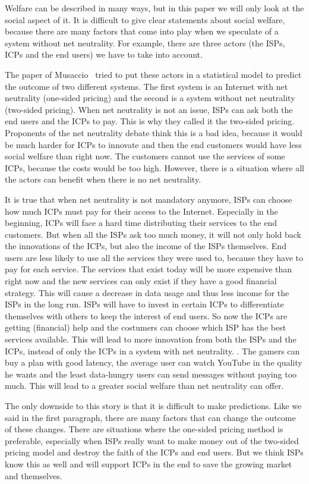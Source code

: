 Welfare can be described in many ways, but in this paper we will only look at the social aspect of it. It is difficult to give clear statements about social welfare, because there are many factors that come into play when we speculate of a system without net neutrality. For example, there are three actors (the \acp{ISP}, \acp{ICP} and the end users) we have to take into account.

The paper of Musaccio~\cite{musacchio2009} tried to put these actors in a statistical model to predict the outcome of two different systems. The first system is an Internet with net neutrality (one-sided pricing) and the second is a system without net neutrality (two-sided pricing). When net neutrality is not an issue, \acp{ISP} can ask both the end users and the \acp{ICP} to pay. This is why they called it the two-sided pricing. Proponents of the net neutrality debate think this is a bad idea, because it would be much harder for \acp{ICP} to innovate and then the end customers would have less social welfare than right now. The customers cannot use the services of some \acp{ICP}, because the costs would be too high. However, there is a situation where all the actors can benefit when there is no net neutrality.

It is true that when net neutrality is not mandatory anymore, \acp{ISP} can choose how much \acp{ICP} must pay for their access to the Internet. Especially in the beginning, \acp{ICP} will face a hard time distributing their services to the end customers. But when all the \acp{ISP} ask too much money, it will not only hold back the innovations of the \acp{ICP}, but also the income of the \acp{ISP} themselves. End users are less likely to use all the services they were used to, because they have to pay for each service. The services that exist today will be more expensive than right now and the new services can only exist if they have a good financial strategy. This will cause a decrease in data usage and thus less income for the \acp{ISP} in the long run. \acp{ISP} will have to invest in certain \acp{ICP} to differentiate themselves with others to keep the interest of end users. So now the \acp{ICP} are getting (financial) help and the costumers can choose which \ac{ISP} has the best services available. This will lead to more innovation from both the \acp{ISP} and the \acp{ICP}, instead of only the \acp{ICP} in a system with net neutrality. . The gamers can buy a plan with good latency, the average user can watch YouTube in the quality he wants and the least data-hungry users can send messages without paying too much. This will lead to a greater social welfare than net neutrality can offer.

The only downside to this story is that it is difficult to make predictions. Like we said in the first paragraph, there are many factors that can change the outcome of these changes. There are situations where the one-sided pricing method is preferable, especially when \acp{ISP} really want to make money out of the two-sided pricing model and destroy the faith of the \acp{ICP} and end users. But we think \acp{ISP} know this as well and will support \acp{ICP} in the end to save the growing market and themselves.
